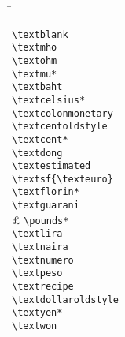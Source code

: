 \begin{multicols}{3}

\begin{tabbing}
\textpertenthousand \hspace{0.01cm} \= \kill %

\textblank 								\> \lstinline|\textblank|\\
\textmho						\> \lstinline|\textmho|\\
\textohm						\> \lstinline|\textohm|\\
\textmu							\> \lstinline|\textmu*|\\
\textbaht						\> \lstinline|\textbaht|\\
\textcelsius 			\> \lstinline|\textcelsius*|\\
\textcolonmonetary 	\> \lstinline|\textcolonmonetary|\\
\textcentoldstyle 		\> \lstinline|\textcentoldstyle|\\
\textcent						\> \lstinline|\textcent*|\\
\textdong						\> \lstinline|\textdong|\\		
\textestimated  			\> \lstinline|\textestimated|\\
\textsf{\texteuro} 	\> \lstinline|\textsf{\texteuro}|\\
\textflorin					\> \lstinline|\textflorin*|\\
\textguarani					\> \lstinline|\textguarani|\\
\pounds 							\> \lstinline|\pounds*|\\
\textlira						\> \lstinline|\textlira|\\
\textnaira 					\> \lstinline|\textnaira|\\
\textnumero  				\> \lstinline|\textnumero|\\
\textpeso 						\> \lstinline|\textpeso|\\
\textrecipe 					\> \lstinline|\textrecipe|\\
\textdollaroldstyle	\> \lstinline|\textdollaroldstyle|\\
\textyen 						\> \lstinline|\textyen*|\\
\textwon							\> \lstinline|\textwon|\\
\end{tabbing}
\end{multicols}